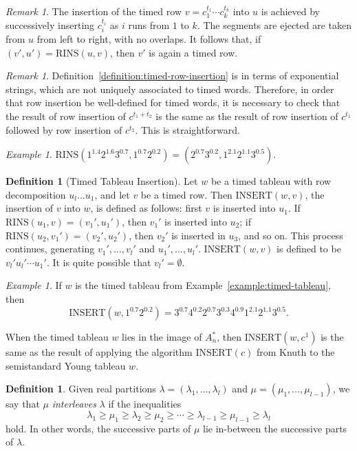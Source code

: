 \documentclass[10pt]{amsproc}
\theoremstyle{definition}
\newtheorem{definition}[theorem]{Definition}
\theoremstyle{remark}
\newtheorem{remark}[theorem]{Remark}
\newtheorem{example}[theorem]{Example}
\newcommand{\rowins}{\mathrm{RINS}}
\newcommand{\ins}{\mathrm{INSERT}}
\begin{document}
\begin{remark}
  The insertion of the timed row $v=c_1^{t_1}\dotsb c_k^{t_k}$ into $u$ is achieved by successively inserting $c_i^{t_i}$ as $i$ runs from $1$ to $k$.
  The segments are ejected are taken from $u$ from left to right, with no overlaps.
  It follows that, if $(v',u')=\rowins(u,v)$, then $v'$ is again a timed row.
\end{remark}
\begin{remark}
  Definition~\ref{definition:timed-row-insertion} is in terms of exponential strings, which are not uniquely associated to timed words.
  Therefore, in order that row insertion be well-defined for timed words, it is necessary to check that the result of row insertion of $c^{t_1+t_2}$ is the same as the result of row insertion of $c^{t_1}$ followed by row insertion of $c^{t_2}$.
  This is straightforward.
\end{remark}
\begin{example}
  \label{example:timed-row-ins}
  $\rowins(1^{1.4}2^{1.6}3^{0.7},1^{0.7}2^{0.2})=(2^{0.7}3^{0.2},1^{2.1}2^{1.1}3^{0.5})$.
\end{example}
\begin{definition}
  [Timed Tableau Insertion]
  \label{definition:timed-tableau-insertion}
  Let $w$ be a timed tableau with row decomposition $u_l\dotsc u_1$, and let $v$ be a timed row.
  Then $\ins(w, v)$, the insertion of $v$ into $w$, is defined as follows:
  first $v$ is inserted into $u_1$.
  If $\rowins(u_1,v)=(v_1',u_1')$, then $v_1'$ is inserted into $u_2$; if $\rowins(u_2,v_1')=(v_2',u_2')$, then $v_2'$ is inserted in $u_3$, and so on.
  This process continues, generating $v_1',\dotsc,v_l'$ and $u_1',\dotsc,u_l'$.
  $\ins(w,v)$ is defined to be $v_l'u_l'\dotsb u_1'$.
  It is quite possible that $v_l'=\emptyset$.
\end{definition}
\begin{example}
  If $w$ is the timed tableau from Example~\ref{example:timed-tableau}, then
  \begin{displaymath}
    \ins(w,1^{0.7}2^{0.2})=3^{0.7}4^{0.2}2^{0.7}3^{0.3}4^{0.9}1^{2.1}2^{1.1}3^{0.5}.
  \end{displaymath}
\end{example}
When the timed tableau $w$ lies in the image of $A_n^*$, then $\ins(w,c^1)$ is the same as the result of applying the algorithm $\text{INSERT}(c)$ from Knuth \cite{knuth} to the semistandard Young tableau $w$.
\begin{definition}
  Given real partitions $\lambda=(\lambda_1,\dotsc,\lambda_l)$ and $\mu=(\mu_1,\dotsc,\mu_{l-1})$, we say that $\mu$ \emph{interleaves} $\lambda$ if the inequalities
  \begin{displaymath}
    \lambda_1 \geq \mu_1 \geq \lambda_2 \geq \mu_2 \geq \dotsb \geq \lambda_{l-1}\geq \mu_{l-1}\geq \lambda_l 
  \end{displaymath}
  hold.
  In other words, the successive parts of $\mu$ lie in-between the successive parts of $\lambda$.
\end{definition}
\end{document}
